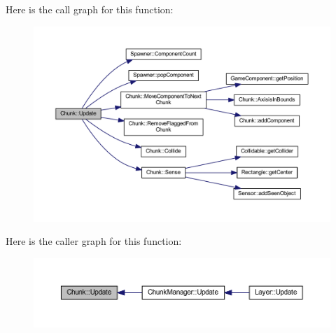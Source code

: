 Here is the call graph for this function\-:
\nopagebreak
\begin{figure}[H]
\begin{center}
\leavevmode
\includegraphics[width=350pt]{class_chunk_a750907d92efc9e45bfff5e280fa55afe_cgraph}
\end{center}
\end{figure}




Here is the caller graph for this function\-:\nopagebreak
\begin{figure}[H]
\begin{center}
\leavevmode
\includegraphics[width=350pt]{class_chunk_a750907d92efc9e45bfff5e280fa55afe_icgraph}
\end{center}
\end{figure}




